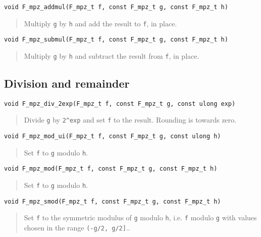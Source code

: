 \documentclass[a4paper,10pt]{article}
\newcommand{\code}{\lstinline}
\begin{document}
\begin{lstlisting}
void F_mpz_addmul(F_mpz_t f, const F_mpz_t g, const F_mpz_t h)
\end{lstlisting}
\begin{quote}
Multiply \code{g} by \code{h} and add the result to \code{f}, in place.
\end{quote}

\begin{lstlisting}
void F_mpz_submul(F_mpz_t f, const F_mpz_t g, const F_mpz_t h)
\end{lstlisting}
\begin{quote}
Multiply \code{g} by \code{h} and subtract the result from \code{f}, in place.
\end{quote}

\subsection{Division and remainder}

\begin{lstlisting}
void F_mpz_div_2exp(F_mpz_t f, const F_mpz_t g, const ulong exp)
\end{lstlisting}
\begin{quote}
Divide \code{g} by \code{2^exp} and set \code{f} to the result. Rounding is towards zero.
\end{quote}

\begin{lstlisting}
void F_mpz_mod_ui(F_mpz_t f, const F_mpz_t g, const ulong h)
\end{lstlisting}
\begin{quote}
Set \code{f} to \code{g} modulo \code{h}.
\end{quote}

\begin{lstlisting}
void F_mpz_mod(F_mpz_t f, const F_mpz_t g, const F_mpz_t h)
\end{lstlisting}
\begin{quote}
Set \code{f} to \code{g} modulo \code{h}.
\end{quote}

\begin{lstlisting}
void F_mpz_smod(F_mpz_t f, const F_mpz_t g, const F_mpz_t h)
\end{lstlisting}
\begin{quote}
Set \code{f} to the symmetric modulus of \code{g} modulo \code{h}, i.e. \code{f} modulo \code{g} with values chosen in the range \code{(-g/2, g/2]}..
\end{quote}
\end{document}
